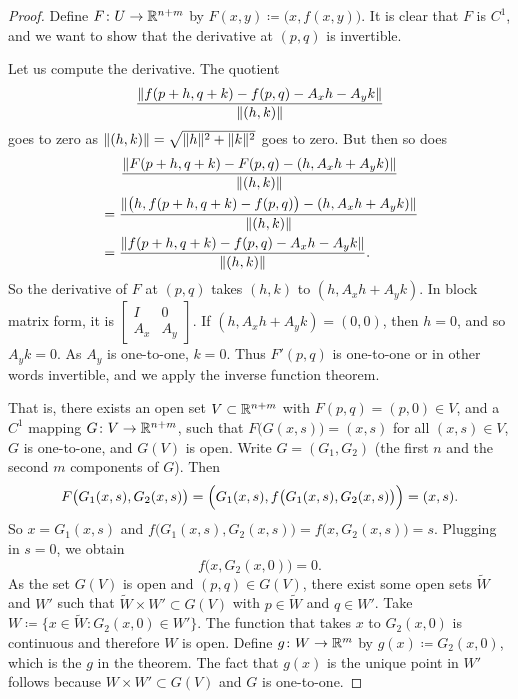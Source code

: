 \begin{proof}
Define $F \colon U \to {\mathbb{R}}^{n+m}$ by $F(x,y) \coloneqq \bigl(x,f(x,y)\bigr)$.
It is clear that $F$ is $C^1$, and we want to show that the derivative
at $(p,q)$ is invertible.

Let us compute the derivative.  The quotient
\begin{equation*}
\frac{\lVert {f(p+h,q+k) - f(p,q) - A_x h - A_y k} \rVert}{\lVert {(h,k)} \rVert}
\end{equation*}
goes to zero as $\lVert {(h,k)} \rVert = \sqrt{\lVert {h} \rVert^2+\lVert {k} \rVert^2}$ goes to zero.
But then so does
\begin{multline*}
\frac{\lVert {F(p+h,q+k)-F(p,q) - (h,A_x h+A_y k)} \rVert}{\lVert {(h,k)} \rVert}
\\
\begin{aligned}
& =
\frac{\lVert {\bigl(h,f(p+h,q+k)-f(p,q)\bigr) - (h,A_x h+A_y
k)} \rVert}{\lVert {(h,k)} \rVert}
\\
& =
\frac{\lVert {f(p+h,q+k) - f(p,q) - A_x h - A_y k} \rVert}{\lVert {(h,k)} \rVert} .
\end{aligned}
\end{multline*}
So the derivative of $F$ at $(p,q)$ takes $(h,k)$ to $(h,A_x h+A_y k)$.
In block matrix form, it is
$\left[\begin{smallmatrix}I & 0\\A_x & A_y\end{smallmatrix}\right]$.  If 
$(h,A_x h+A_y k) = (0,0)$, then $h=0$, and so $A_y k = 0$.  As $A_y$ is
one-to-one, $k=0$.  Thus $F'(p,q)$ is one-to-one or in other
words invertible, and we apply the inverse function theorem.

That is, there exists an open set $V \subset {\mathbb{R}}^{n+m}$ with
$F(p,q) = (p,0) \in V$,
and a  $C^1$
mapping $G \colon V \to {\mathbb{R}}^{n+m}$, such that $F\bigl(G(x,s)\bigr) = (x,s)$ for
all $(x,s) \in V$, $G$ is one-to-one, and $G(V)$ is open. %
Write $G = (G_1,G_2)$ (the first $n$ and the second $m$ components of $G$).
Then
\begin{equation*}
F\bigl(G_1(x,s),G_2(x,s)\bigr) = \Bigl(G_1(x,s),f\bigl(G_1(x,s),G_2(x,s) \bigr)\Bigr)
= (x,s) .
\end{equation*}
So $x = G_1(x,s)$ and $f\bigl(G_1(x,s),G_2(x,s)\bigr) = f\bigl(x,G_2(x,s)\bigr) = s$.
Plugging in $s=0$, we obtain
\begin{equation*}
f\bigl(x,G_2(x,0)\bigr) = 0 .
\end{equation*}
As the set $G(V)$ is open and $(p,q) \in G(V)$,
there exist some open sets
$\widetilde{W}$ and $W'$ such that $\widetilde{W} \times W' \subset G(V)$ with $p
\in \widetilde{W}$ and
$q \in W'$.
Take $W \coloneqq \bigl\{ x \in \widetilde{W} : G_2(x,0) \in W' \bigr\}$.
The function that takes $x$ to $G_2(x,0)$ is continuous and therefore $W$
is open.
Define
$g \colon W \to {\mathbb{R}}^m$ by $g(x) \coloneqq G_2(x,0)$, which is the $g$ in the theorem.
The fact that $g(x)$ is the unique point in $W'$ follows because $W \times
W' \subset G(V)$ and $G$ is one-to-one.


\end{proof}
